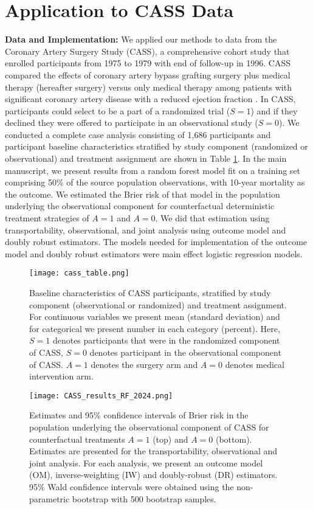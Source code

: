 \documentclass[11pt]{article}
\begin{document}
\section*{Application to CASS Data}
\textbf{Data and Implementation:} We applied our methods to data from the Coronary Artery Surgery Study (CASS), a comprehensive cohort study that enrolled participants from 1975 to 1979 with end of follow-up in 1996. CASS compared the effects of coronary artery bypass grafting surgery plus medical therapy (hereafter surgery) versus only medical therapy among patients with significant coronary artery disease with a reduced ejection fraction \cite{cass83, cass84}. In CASS, participants could select to be a part of a randomized trial ($S=1$) and if they declined they were offered to participate in an observational study ($S=0$). We conducted a complete case analysis consisting of 1,686 participants and participant baseline characteristics stratified by study component (randomized or observational) and treatment assignment are shown in Table \ref{fig:CASS_table}. In the main manuscript, we present results from a random forest model fit on a training set comprising 50\% of the source population observations, with 10-year mortality as the outcome. We estimated the Brier risk of that model in the population underlying the observational component for counterfactual deterministic treatment strategies of $A=1$ and $A=0$. We did that estimation using transportability, observational, and joint analysis using outcome model and doubly robust estimators. The models needed for implementation of the outcome model and doubly robust estimators were main effect logistic regression models. 
\begin{figure}[h]
    \centering
    \texttt{[image: cass\_table.png]}
    \caption{Baseline characteristics of CASS participants, stratified by study component (observational or randomized) and treatment assignment. For continuous variables we present mean (standard deviation) and for categorical we present number in each category (percent). Here, $S=1$ denotes participants that were in the randomized component of CASS, $S=0$ denotes participant in the observational component of CASS. $A=1$ denotes the surgery arm and $A=0$ denotes medical intervention arm.}
    \label{fig:CASS_table}
\end{figure}
\begin{figure}[h]
    \centering
    \texttt{[image: CASS\_results\_RF\_2024.png]}    

    \caption{Estimates and 95\% confidence intervals of Brier risk in the population underlying the observational component of CASS for counterfactual treatments $A=1$ (top) and $A=0$ (bottom). Estimates are presented for the transportability, observational and joint analysis. For each analysis, we present an outcome model (OM), inverse-weighting (IW) and doubly-robust (DR) estimators. 95\% Wald confidence intervals were obtained using the non-parametric bootstrap with 500 bootstrap samples.} 
    \label{fig:CASS_results}
\end{figure}
\end{document}
